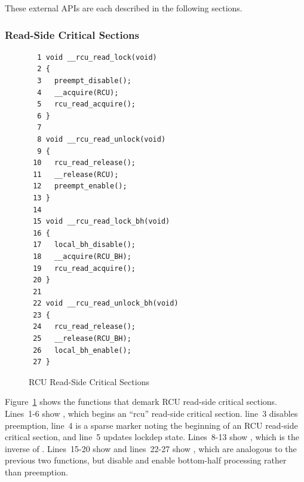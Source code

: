 These external APIs are each described in the following sections.

\subsubsection{Read-Side Critical Sections}
\label{app:rcuimpl:rcutreewt:Read-Side Critical Sections}

\begin{figure}[tbp]
{ \scriptsize
\begin{verbatim}
  1 void __rcu_read_lock(void)
  2 {
  3   preempt_disable();
  4   __acquire(RCU);
  5   rcu_read_acquire();
  6 }
  7
  8 void __rcu_read_unlock(void)
  9 {
 10   rcu_read_release();
 11   __release(RCU);
 12   preempt_enable();
 13 }
 14
 15 void __rcu_read_lock_bh(void)
 16 {
 17   local_bh_disable();
 18   __acquire(RCU_BH);
 19   rcu_read_acquire();
 20 }
 21
 22 void __rcu_read_unlock_bh(void)
 23 {
 24   rcu_read_release();
 25   __release(RCU_BH);
 26   local_bh_enable();
 27 }
\end{verbatim}
}
\caption{RCU Read-Side Critical Sections}
\label{fig:app:rcuimpl:rcutreewt:RCU Read-Side Critical Sections}
\end{figure}

Figure~\ref{fig:app:rcuimpl:rcutreewt:RCU Read-Side Critical Sections}
shows the functions that demark RCU read-side critical sections.
Lines~1-6 show , which begins an ``rcu''
read-side critical section.
line~3 disables preemption,
line~4 is a sparse marker noting the beginning of an RCU read-side critical
section,
and
line~5 updates lockdep state.
Lines~8-13 show , which is the inverse of
.
Lines~15-20 show  and lines~22-27 show
, which are analogous to the previous
two functions, but disable and enable bottom-half processing rather
than preemption.

